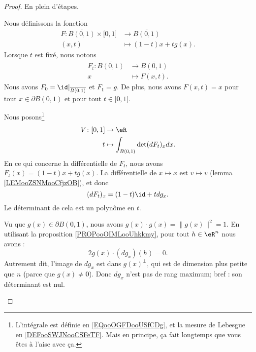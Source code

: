\begin{proof}
	En plein d'étapes.
	\begin{subproof}
		Nous définissons la fonction
		\begin{equation}
			\begin{aligned}
				F\colon \overline{B(0,1)}\times\mathopen[ 0,1\mathclose] & \to  \overline{B(0,1)} \\
				(x,t)                                                    & \mapsto (1-t)x+tg(x).
			\end{aligned}
		\end{equation}
		Lorsque \( t\) est fixé, nous notons
		\begin{equation}
			\begin{aligned}
				F_t\colon \overline{B(0,1)} & \to \overline{B(0,1)} \\
				x                           & \mapsto F(x,t).
			\end{aligned}
		\end{equation}
		Nous avons \( F_0=\id|_{\overline{B(0,1)}} \) et \( F_1=g\). De plus, nous avons \( F(x,t)=x\) pour tout \( x\in\partial B(0,1)\) et pour tout \( t\in\mathopen[ 0,1\mathclose]\).

		\spitem[définition de \( V\)]
		Nous posons\footnote{L'intégrale est définie en \eqref{EQooOGFDooUSfCDg}, et la mesure de Lebesgue en \ref{DEFooSWJNooCSFeTF}. Mais en principe, ça fait longtemps que vous êtes à l'aise avec ça.}
		\begin{equation}
			\begin{aligned}
				V\colon \mathopen[ 0,1\mathclose] & \to \eR                              \\
				t                                 & \mapsto \int_{B(0,1)}\det(dF_t)_xdx.
			\end{aligned}
		\end{equation}
		En ce qui concerne la différentielle de \( F_t\), nous avons \( F_t(x)=(1-t)x+tg(x)\). La différentielle de \( x\mapsto x\) est \( v\mapsto v\) (lemma \ref{LEMooZSNMooCfjzOB}), et donc
		\begin{equation}
			(dF_t)_x=(1-t)\id+tdg_x.
		\end{equation}
		Le déterminant de cela est un polynôme en \( t\).

		\spitem[\( V(1)=0\)]
		Vu que \( g(x)\in \partial B(0,1)\), nous avons \( g(x)\cdot g(x)= \| g(x) \|^2=1\). En utilisant la proposition \ref{PROPooOIMLooUhkkmy}, pour tout \( h\in \eR^n\) nous avons :
		\begin{equation}
			2g(x)\cdot (dg_x)(h)=0.
		\end{equation}
		Autrement dit, l'image de \( dg_x\) est dans \( g(x)^{\perp}\), qui est de dimension plus petite que \( n\) (parce que \( g(x)\neq 0\)). Donc \( dg_x\) n'est pas de rang maximum; bref : son déterminant est nul.


\end{subproof}
\end{proof}
